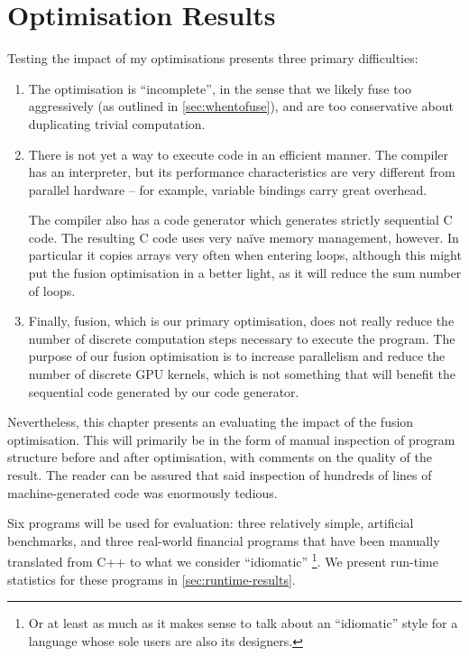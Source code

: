 \chapter{Optimisation Results}
\label{chap:optimisation-results}

Testing the impact of my optimisations presents three primary
difficulties:

\begin{enumerate}
\item The optimisation is ``incomplete'', in the sense that we likely
  fuse too aggressively (as outlined in \cref{sec:whentofuse}), and
  are too conservative about duplicating trivial computation.

\item There is not yet a way to execute \LO{} code in an efficient
  manner.  The \LO{} compiler has an interpreter, but its performance
  characteristics are very different from parallel hardware -- for
  example, variable bindings carry great overhead.

  The compiler also has a code generator which generates strictly
  sequential C code.  The resulting C code uses very naïve memory
  management, however.  In particular it copies arrays very often when
  entering loops, although this might put the fusion optimisation in a
  better light, as it will reduce the sum number of loops.

\item Finally, fusion, which is our primary optimisation, does not
  really reduce the number of discrete computation steps necessary to
  execute the program.  The purpose of our fusion optimisation is to
  increase parallelism and reduce the number of discrete GPU kernels,
  which is not something that will benefit the sequential code
  generated by our code generator.
\end{enumerate}

Nevertheless, this chapter presents an evaluating the impact of the
fusion optimisation.  This will primarily be in the form of manual
inspection of program structure before and after optimisation, with
comments on the quality of the result.  The reader can be assured that
said inspection of hundreds of lines of machine-generated code was
enormously tedious.

Six programs will be used for evaluation: three relatively simple,
artificial benchmarks, and three real-world financial programs that
have been manually translated from C++ to what we consider
``idiomatic'' \LO{}\footnote{Or at least as much as it makes sense to
  talk about an ``idiomatic'' style for a language whose sole users
  are also its designers.}.  We present run-time statistics for these
programs in \cref{sec:runtime-results}.

